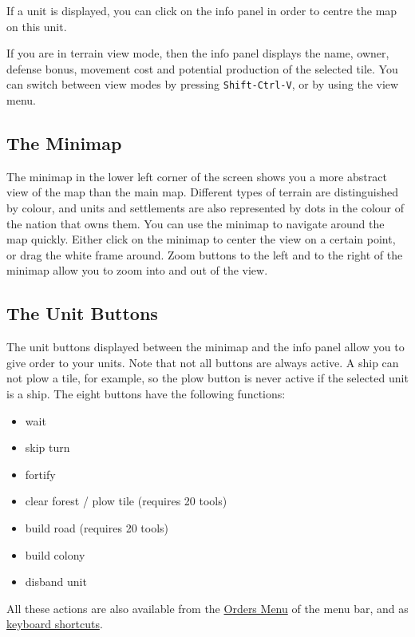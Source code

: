 \documentclass[12pt]{book}
\begin{document}
If a unit is displayed, you can click on the info panel in order to
centre the map on this unit.

If you are in terrain view mode, then the info panel displays the
name, owner, defense bonus, movement cost and potential production of
the selected tile. You can switch between view modes by pressing
\verb$Shift-Ctrl-V$, or by using the view menu.


\hypertarget{minimap}{\subsection{The Minimap}}

The minimap in the lower left corner of the screen shows you a more
abstract view of the map than the main map. Different types of terrain
are distinguished by colour, and units and settlements are also
represented by dots in the colour of the nation that owns them. You
can use the minimap to navigate around the map quickly.  Either click
on the minimap to center the view on a certain point, or drag the
white frame around. Zoom buttons to the left and to the right of the
minimap allow you to zoom into and out of the view.


\hypertarget{unit buttons}{\subsection{The Unit Buttons}}

The unit buttons displayed between the minimap and the info panel
allow you to give order to your units. Note that not all buttons are
always active. A ship can not plow a tile, for example, so the plow
button is never active if the selected unit is a ship. The eight
buttons have the following functions:

\begin{itemize}
\item wait
\item skip turn
\item fortify
\item clear forest / plow tile (requires 20 tools)
\item build road (requires 20 tools)
\item build colony
\item disband unit
\end{itemize}

All these actions are also available from the \hyperlink{orders
menu}{Orders Menu} of the menu bar, and as \hyperlink{keyboard
shortcuts}{keyboard shortcuts}.
\end{document}
